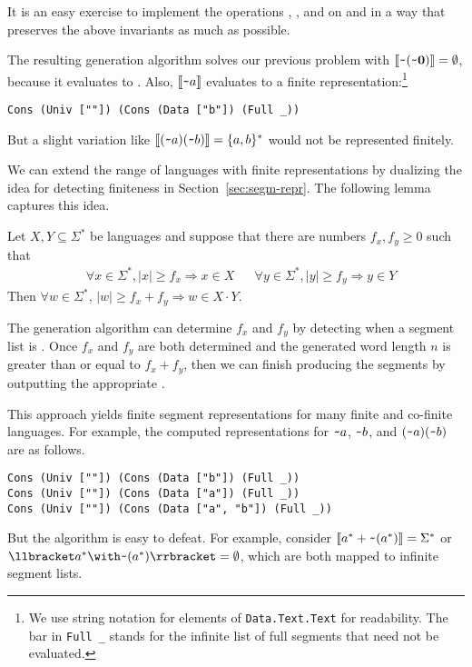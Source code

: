 It is an easy exercise to implement the operations
, , and  on 
and  in a way that preserves the above invariants as
much as possible.

The resulting generation algorithm solves our previous problem 
with $\llbracket\texttt{\textasciitilde}{(\texttt{\textasciitilde}{\mathbf0})}\rrbracket = \emptyset$,
because it evaluates to . Also, $\llbracket\texttt{\textasciitilde}{a}\rrbracket$
evaluates to a finite representation:\footnote{We use string notation
  for elements of \lstinline{Data.Text.Text} for readability. The bar in \lstinline{Full _} stands for the infinite list of full segments that need not be evaluated.}
\begin{lstlisting}[numbers=none]
Cons (Univ [""]) (Cons (Data ["b"]) (Full _))
\end{lstlisting}
But a slight variation like
$\llbracket(\texttt{\textasciitilde}{a})(\texttt{\textasciitilde}{b})\rrbracket = \{a,b\}^*$ would not be
represented finitely.

We can extend the range of languages with
finite representations by dualizing the idea for
detecting finiteness in Section~\ref{sec:segm-repr}. The following
lemma captures this idea.
\begin{lemma}
Let $X, Y \subseteq \Sigma^*$ be languages and 
suppose that there are numbers $f_x, f_y\ge0$ such that
\begin{align*}
  & \forall x \in \Sigma^*,  |x| \ge f_x \Rightarrow x \in X
  && \forall y \in \Sigma^*, |y| \ge f_y \Rightarrow y \in Y
\end{align*}
Then $\forall w \in \Sigma^*$, $|w|\ge f_x+f_y \Rightarrow w \in X\cdot Y$.
\end{lemma}
The generation algorithm can determine $f_x$
and $f_y$ by detecting when a segment list is . Once $f_x$
and $f_y$ are both determined and the generated word length $n$ is
greater than or equal to $f_x+f_y$, then we can finish producing the segments by
outputting the appropriate .

This approach yields finite segment representations
for many finite and co-finite languages. For example, the computed
representations for $\texttt{\textasciitilde} a$, $\texttt{\textasciitilde} b$, and
${(\texttt{\textasciitilde}{a})(\texttt{\textasciitilde}{b})}$ are as follows. 
\begin{lstlisting}[numbers=none]
Cons (Univ [""]) (Cons (Data ["b"]) (Full _))
Cons (Univ [""]) (Cons (Data ["a"]) (Full _))
Cons (Univ [""]) (Cons (Data ["a", "b"]) (Full _))
\end{lstlisting}
But the algorithm is easy to defeat. For example, consider
$\llbracket a^* + \texttt{\textasciitilde}{(a^*)}\rrbracket = \Sigma^*$ or
$\Lang{\Rintersect{\Rstar a} \Rcomplement{(\Rstar a)}} = \emptyset$,
which are both mapped to infinite segment lists.

